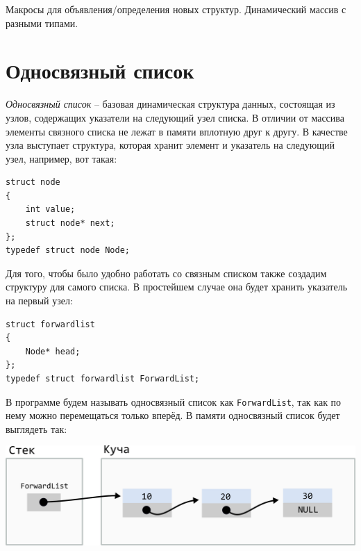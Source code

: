 \documentclass[10pt]{article}
\begin{document}
Макросы для объявления/определения новых структур. Динамический массив с разными типами.

\newpage
\section*{Односвязный список}

\textit{Односвязный список} -- базовая динамическая структура данных, состоящая из узлов, содержащих указатели на следующий узел списка. В отличии от массива элементы связного списка не лежат в памяти вплотную друг к другу. В качестве узла выступает структура, которая хранит элемент и указатель на следующий узел, например, вот такая:
\begin{lstlisting}
struct node 
{
    int value;
    struct node* next;
};
typedef struct node Node;
\end{lstlisting}

Для того, чтобы было удобно работать со связным списком также создадим структуру для самого списка. В простейшем случае она будет хранить указатель на первый узел:
\begin{lstlisting}
struct forwardlist 
{
    Node* head;
};
typedef struct forwardlist ForwardList;
\end{lstlisting}

В программе будем называть односвязный список как \texttt{ForwardList}, так как по нему можно перемещаться только вперёд. В памяти односвязный список будет выглядеть так:
\begin{center}
\includegraphics[scale=0.85]{../images/forward_list.png}
\end{center}





\iffalse
\newpage
\end{document}
